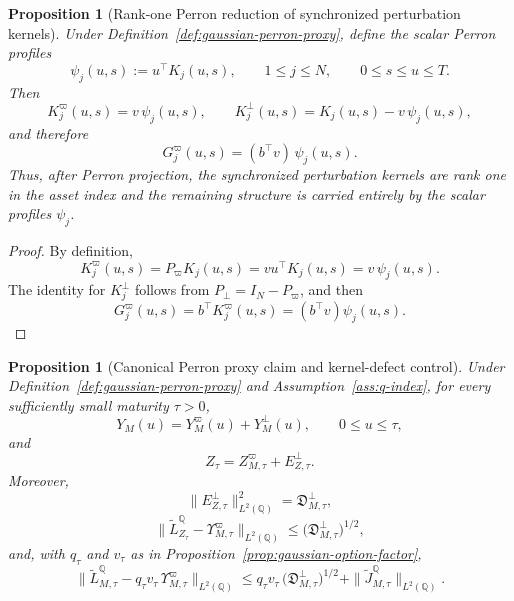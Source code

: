\documentclass[11pt,a4paper]{amsart}
\theoremstyle{plain}
\newtheorem{proposition}[theorem]{Proposition}
\theoremstyle{definition}
\theoremstyle{remark}
\newcommand{\QQ}{\mathbb{Q}}
\begin{document}
\begin{proposition}[Rank-one Perron reduction of synchronized perturbation kernels]\label{prop:gaussian-rank-one}
Under Definition~\ref{def:gaussian-perron-proxy}, define the scalar Perron profiles
\[
        \psi_j(u,s):=u^\top K_j(u,s),
        \qquad
        1\le j\le N,
        \qquad
        0\le s\le u\le T.
\]
Then
\[
        K_j^\varpi(u,s)=v\,\psi_j(u,s),
        \qquad
        K_j^\perp(u,s)=K_j(u,s)-v\,\psi_j(u,s),
\]
and therefore
\[
        G_j^\varpi(u,s)
        =
        (b^\top v)\,\psi_j(u,s).
\]
Thus, after Perron projection, the synchronized perturbation kernels are rank one in the asset
index and the remaining structure is carried entirely by the scalar profiles \(\psi_j\).
\end{proposition}

\begin{proof}
By definition,
\[
        K_j^\varpi(u,s)
        =
        P_\varpi K_j(u,s)
        =
        vu^\top K_j(u,s)
        =
        v\,\psi_j(u,s).
\]
The identity for \(K_j^\perp\) follows from \(P_\perp=I_N-P_\varpi\), and then
\[
        G_j^\varpi(u,s)=b^\top K_j^\varpi(u,s)=(b^\top v)\psi_j(u,s).
\]
\end{proof}

\begin{proposition}[Canonical Perron proxy claim and kernel-defect control]\label{prop:gaussian-perron-proxy}
Under Definition~\ref{def:gaussian-perron-proxy} and Assumption~\ref{ass:q-index}, for every
sufficiently small maturity \(\tau>0\),
\[
        Y_M(u)=Y_M^\varpi(u)+Y_M^\perp(u),
        \qquad
        0\le u\le \tau,
\]
and
\[
        Z_\tau
        =
        Z_{M,\tau}^\varpi
        +
        E_{Z,\tau}^\perp.
\]
Moreover,
\[
        \|E_{Z,\tau}^\perp\|_{L^2(\QQ)}^2
        =
        \mathfrak D_{M,\tau}^\perp,
\]
\[
        \|\widetilde L_{Z_\tau}^\QQ-\Upsilon_{M,\tau}^\varpi\|_{L^2(\QQ)}
        \le
        \bigl(\mathfrak D_{M,\tau}^\perp\bigr)^{1/2},
\]
and, with \(q_\tau\) and \(v_\tau\) as in Proposition~\ref{prop:gaussian-option-factor},
\[
        \|\widetilde L_{M,\tau}^\QQ-q_\tau v_\tau\,\Upsilon_{M,\tau}^\varpi\|_{L^2(\QQ)}
        \le
        q_\tau v_\tau\,\bigl(\mathfrak D_{M,\tau}^\perp\bigr)^{1/2}
        +
        \|\widetilde J_{M,\tau}^\QQ\|_{L^2(\QQ)}.
\]
\end{proposition}
\end{document}
